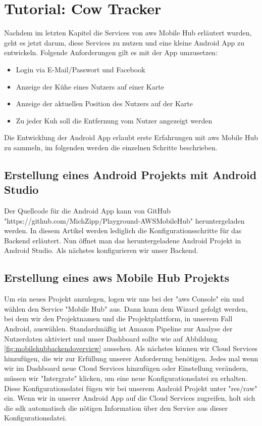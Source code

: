 \section{Tutorial: Cow Tracker}
Nachdem im letzten Kapitel die Services von \gls{aws} Mobile Hub erläutert wurden, geht es jetzt darum, diese Services zu nutzen und eine kleine Android App zu entwickeln. Folgende Anforderungen gilt es mit der App umzusetzen:
\begin{itemize}
	\item Login via E-Mail/Passwort und Facebook
	\item Anzeige der Kühe eines Nutzers auf einer Karte
	\item Anzeige der aktuellen Position des Nutzers auf der Karte
	\item Zu jeder Kuh soll die Entfernung vom Nutzer angezeigt werden	 
\end{itemize}
Die Entwicklung der Android App erlaubt erste Erfahrungen mit \gls{aws} Mobile Hub zu sammeln, im folgenden werden die einzelnen Schritte beschrieben. 

\subsection{Erstellung eines Android Projekts mit Android Studio}
Der Quellcode für die Android App kann von GitHub "https://github.com/MichZipp/Playground-AWSMobileHub" heruntergeladen werden. In diesem Artikel werden lediglich die Konfigurationsschritte für das Backend erläutert. Nun öffnet man das heruntergeladene Android Projekt in Android Studio. Als nächstes konfigurieren wir unser Backend. 

\subsection{Erstellung eines \gls{aws} Mobile Hub Projekts}\label{erstellungmbprojekt}
Um ein neues Projekt anzulegen, logen wir uns bei der "\gls{aws} Console" ein und wählen den Service "Mobile Hub" aus. Dann kann dem Wizard gefolgt werden, bei dem wir den Projektnamen und die Projektplattform, in unserem Fall Android, auswählen. Standardmäßig ist Amazon Pipeline zur Analyse der Nutzerdaten aktiviert und unser Dashboard sollte wie auf Abbildung \ref{fig:mobilehubbackendoverview} aussehen. Als nächstes können wir Cloud Services hinzufügen, die wir zur Erfüllung unserer Anforderung benötigen. Jedes mal wenn wir im Dashboard neue Cloud Services hinzufügen oder Einstellung verändern, müssen wir "Intergrate" klicken, um eine neue Konfigurationsdatei zu erhalten. Diese Konfigurationsdatei fügen wir bei unserem Android Projekt unter "res/raw" ein. Wenn wir in unserer Android App auf die Cloud Services zugreifen, holt sich die \gls{sdk} automatisch die nötigen Information über den Service aus dieser Konfigurationsdatei.

